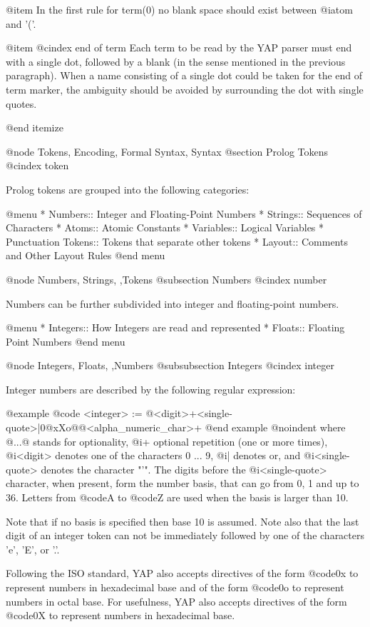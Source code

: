 {@item
In the first rule for term(0) no blank space should exist between
@i{atom} and '('.

@item
@cindex end of term
Each term to be read by the YAP parser must end with a single
dot, followed by a blank (in the sense mentioned in the previous
paragraph). When a name consisting of a single dot could be taken for
the end of term marker, the ambiguity should be avoided by surrounding the
dot with single quotes.

@end itemize

@node Tokens, Encoding, Formal Syntax, Syntax
@section Prolog Tokens
@cindex token

Prolog tokens are grouped into the following categories:

@menu
* Numbers:: Integer and Floating-Point Numbers
* Strings:: Sequences of Characters
* Atoms:: Atomic Constants
* Variables:: Logical Variables
* Punctuation Tokens:: Tokens that separate other tokens
* Layout:: Comments and Other Layout Rules
@end menu

@node Numbers, Strings, ,Tokens
@subsection Numbers
@cindex number

Numbers can be further subdivided into integer and floating-point numbers.

@menu
* Integers:: How Integers are read and represented
* Floats:: Floating Point Numbers
@end menu

@node Integers, Floats, ,Numbers
@subsubsection Integers
@cindex integer

Integer numbers
are described by the following regular expression:

@example
@code{
<integer> := @{<digit>+<single-quote>|0@{xXo@}@}<alpha_numeric_char>+
}
@end example
@noindent
where @{...@} stands for optionality, @i{+} optional repetition (one or
more times), @i{<digit>} denotes one of the characters 0 ... 9, @i{|}
denotes or, and @i{<single-quote>} denotes the character "'". The digits
before the @i{<single-quote>} character, when present, form the number
basis, that can go from 0, 1 and up to 36. Letters from @code{A} to
@code{Z} are used when the basis is larger than 10.

Note that if no basis is specified then base 10 is assumed. Note also
that the last digit of an integer token can not be immediately followed
by one of the characters 'e', 'E', or '.'.

Following the ISO standard, YAP also accepts directives of the
form @code{0x} to represent numbers in hexadecimal base and of the form
@code{0o} to represent numbers in octal base. For usefulness,
YAP also accepts directives of the form @code{0X} to represent
numbers in hexadecimal base.

}
